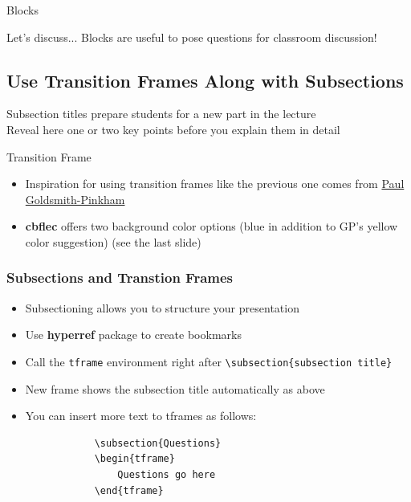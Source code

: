 \documentclass[11pt, aspectratio=43]{beamer}
\begin{document}
\begin{frame}{Blocks}
    \begin{block}{Let's discuss...}
        Blocks are useful to pose questions for classroom discussion!
    \end{block}
\end{frame}

\subsection{Use Transition Frames Along with Subsections}
\begin{tframe}
    Subsection titles prepare students for a new part in the lecture\\[2ex]
    Reveal here one or two key points before you explain them in detail 
\end{tframe}

\begin{frame}{Transition Frame}
    \begin{itemize}
        \item Inspiration for using transition frames like the previous one comes from \href{https://paulgp.github.io/beamer_tips.pdf}{Paul Goldsmith-Pinkham}
        \item \textbf{cbflec} offers two background color options (blue in addition to GP's yellow color suggestion) (see the last slide)
    \end{itemize}
\end{frame}

\begin{frame}[fragile]
    \frametitle{Subsections and Transtion Frames}
    \begin{itemize}
        \item Subsectioning allows you to structure your presentation
        \item Use \textbf{hyperref} package to create bookmarks 
        \item Call the \verb!tframe! environment right after \verb|\subsection{subsection title}|
        \item New frame shows the subsection title automatically as above
        \item You can insert more text to tframes as follows:
        \begin{verbatim}
            \subsection{Questions}
            \begin{tframe}
                Questions go here
            \end{tframe}
        \end{verbatim}
    \end{itemize}
\end{frame}
\end{document}
